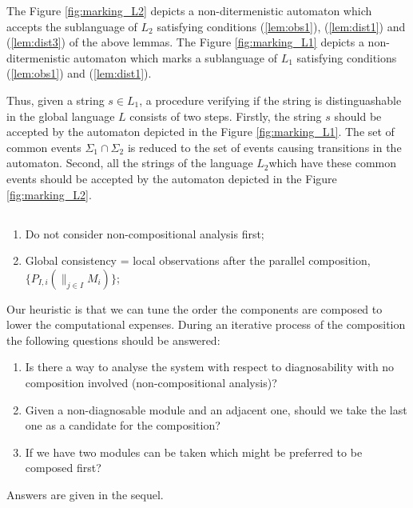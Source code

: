 \documentclass[a4paper, 10pt, conference]{ieeeconf}
\begin{document}
The Figure \ref{fig:marking_L2} depicts a non-ditermenistic automaton which
accepts the sublanguage of $L_2$ satisfying conditions (\ref{lem:obs1}),
(\ref{lem:dist1}) and (\ref{lem:dist3}) of the above lemmas.
The Figure \ref{fig:marking_L1} depicts a non-ditermenistic automaton which
marks a sublanguage of $L_1$ satisfying conditions (\ref{lem:obs1}) and
(\ref{lem:dist1}). 

Thus, given a string $s \in L_1$, a procedure verifying if the string is
distinguashable in the global language $L$ consists of two steps. Firstly, the
string $s$ should be accepted by the automaton depicted in the Figure
\ref{fig:marking_L1}. The set of common events $\Sigma_1 \cap \Sigma_2$
is reduced to the set of events causing transitions in the automaton. Second,
all the strings of the language $L_2$which have these common events should be
accepted by the automaton depicted in the Figure \ref{fig:marking_L2}. 

\newpage

\subsection{}
\begin{enumerate}
  \item Do not consider non-compositional analysis first;
  \item Global consistency = local observations after the parallel
  composition, $\{ P_{I,i}(\parallel_{j \in I}M_i)\}$;
         
\end{enumerate} 

Our heuristic is that we can tune the order the components are composed to lower
the computational expenses. During an iterative process of the composition the
following questions should be answered:
\begin{enumerate}
  \item Is there a way to analyse the system with respect to diagnosability with
  no composition involved (non-compositional analysis)?
  \item Given a non-diagnosable module and an adjacent one, should we take
  the last one as a candidate for the composition?
  \item If we have two modules can be taken which might be preferred to be
  composed first?
\end{enumerate}

Answers are given in the sequel.
\end{document}
